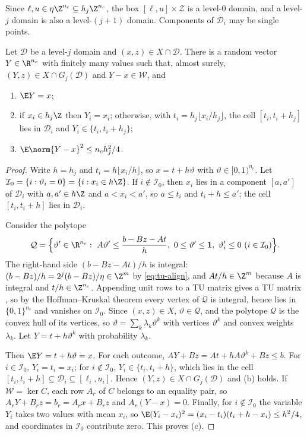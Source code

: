 Since $\ell,u\in\eta\Z^{n_c}\subseteq h_j\Z^{n_c}$, the box
$[\ell,u]\times\mathcal Z$ is a level-$0$ domain, and a level-$j$ domain is
also a level-$(j+1)$ domain. Components of $\mathcal D_i$ may be single points.

\begin{lemma}\label{lem:tu-round}
Let $\mathcal D$ be a level-$j$ domain and $(x,z)\in X\cap\mathcal D$. There is
a random vector $Y\in\R^{n_c}$ with finitely many values such that, almost
surely, $(Y,z)\in X\cap G_j(\mathcal D)$ and $Y-x\in\mathcal W$, and
\begin{enumerate}[label=(\alph*)]
\item $\E Y=x$;
\item if $x_i\in h_j\Z$ then $Y_i=x_i$; otherwise, with
$t_i=h_j\lfloor x_i/h_j\rfloor$, the cell $[t_i,t_i+h_j]$ lies in $\mathcal D_i$
and $Y_i\in\{t_i,t_i+h_j\}$;
\item $\E\norm{Y-x}^2\le n_ch_j^2/4$.
\end{enumerate}
\end{lemma}

\begin{proof}
Write $h=h_j$ and $t_i=h\lfloor x_i/h\rfloor$, so $x=t+h\vartheta$ with
$\vartheta\in[0,1)^{n_c}$. Let
$\mathcal I_0=\{i:\vartheta_i=0\}=\{i:x_i\in h\Z\}$. If $i\notin\mathcal I_0$,
then $x_i$ lies in a component $[a,a']$ of $\mathcal D_i$ with $a,a'\in h\Z$
and $a<x_i<a'$, so $a\le t_i$ and $t_i+h\le a'$; the cell $[t_i,t_i+h]$ lies
in $\mathcal D_i$.

Consider the polytope
\[
\mathcal Q=\Bigl\{\vartheta'\in\R^{n_c}:\ A\vartheta'\le\frac{b-Bz-At}{h},\
0\le\vartheta'\le\mathbf 1,\ \vartheta'_i\le0\ (i\in\mathcal I_0)\Bigr\}.
\]
The right-hand side $(b-Bz-At)/h$ is integral:
$(b-Bz)/h=2^j(b-Bz)/\eta\in\Z^m$ by \eqref{eq:tu-align}, and $At/h\in\Z^m$
because $A$ is integral and $t/h\in\Z^{n_c}$. Appending unit rows to a TU
matrix gives a TU matrix \cite[Section~19.1]{Schrijver1986}, so by the
Hoffman--Kruskal theorem \cite{HoffmanKruskal1956} every vertex of $\mathcal Q$
is integral, hence lies in $\{0,1\}^{n_c}$ and vanishes on $\mathcal I_0$.
Since $(x,z)\in X$, $\vartheta\in\mathcal Q$, and the polytope $\mathcal Q$ is
the convex hull of its vertices, so $\vartheta=\sum_k\lambda_k\vartheta^k$ with
vertices $\vartheta^k$ and convex weights $\lambda_k$. Let
$Y=t+h\vartheta^k$ with probability $\lambda_k$.

Then $\E Y=t+h\vartheta=x$. For each outcome,
$AY+Bz=At+hA\vartheta^k+Bz\le b$. For $i\in\mathcal I_0$, $Y_i=t_i=x_i$; for
$i\notin\mathcal I_0$, $Y_i\in\{t_i,t_i+h\}$, which lies in the cell
$[t_i,t_i+h]\subseteq\mathcal D_i\subseteq[\ell_i,u_i]$. Hence
$(Y,z)\in X\cap G_j(\mathcal D)$ and (b) holds. If $\mathcal W=\ker C$, each row
$A_r$ of $C$ belongs to an equality pair, so $A_rY+B_rz=b_r=A_rx+B_rz$ and
$A_r(Y-x)=0$. Finally, for $i\notin\mathcal I_0$ the variable $Y_i$ takes two
values with mean $x_i$, so $\E(Y_i-x_i)^2=(x_i-t_i)(t_i+h-x_i)\le h^2/4$, and
coordinates in $\mathcal I_0$ contribute zero. This proves (c).
\end{proof}

